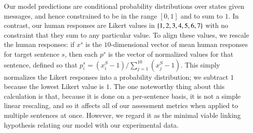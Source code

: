\documentclass[leqno,12pt]{article}
\begin{document}
Our model predictions are conditional probability distributions over
states given messages, and hence constrained to be in the range
$[0,1]$ and to sum to $1$. In contrast, our human responses are Likert
values in $\left\{ 1,2,3,4,5,6,7 \right\}$ with no constraint that they sum to
any particular value. To align these values, we rescale the human
responses: if $x^{s}$ is the $10$-dimensional vector of mean human
responses for target sentence $s$, then each $p^{s}$ is the vector of
normalized values for that sentence, defined so that
$p^{s}_{i} = (x^{S}_{i}-1)/\sum_{j=1}^{10}(x^{S}_{j}-1)$. This simply
normalizes the Likert responses into a probability distribution; we
subtract $1$ because the lowest Likert value is $1$. The one
noteworthy thing about this calculation is that, because it is done on
a per-sentence basis, it is not a simple linear rescaling, and so it
affects all of our assessment metrics when applied to multiple
sentences at once. However, we regard it as the minimal viable
linking hypothesis relating our model with our experimental data.
\end{document}
